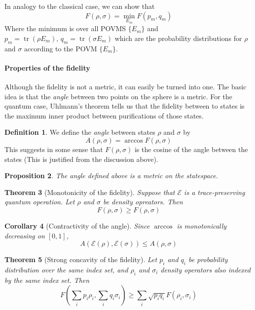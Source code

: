 \documentclass[11pt,a4paper]{article}
\theoremstyle{definition}
\newtheorem{definition}{Definition}[section]
\theoremstyle{plain}
\newtheorem{theorem}[definition]{Theorem}
\newtheorem{proposition}[definition]{Proposition}
\newtheorem{corollary}[definition]{Corollary}
\theoremstyle{remark}
\begin{document}
In analogy to the classical case, we can show that 
$$F(\rho, \sigma) = \min_{E_m} F(p_m, q_m)$$
Where the minimum is over all POVMS $\{E_m\}$ and $p_m = \operatorname{tr}(\rho E_m), \, q_m = \operatorname{tr}(\sigma E_m)$ which are the 
probability distributions for $\rho$ and $\sigma$ according to the POVM $\{E_m\}$. 

\paragraph{Properties of the fidelity} Although the fidelity is not a metric, it can easily be turned into one. 
The basic idea is that the \emph{angle} between two points on the sphere is a metric. For the quantum case, Uhlmann's theorem tells us that the 
fidelity between to states is the maximum inner product between purifications of those states. 

\begin{definition}
  We define the \emph{angle} between states $\rho$ and $\sigma$ by 
  $$A(\rho, \sigma) = \arccos F(\rho, \sigma)$$
  This suggests in some sense that $F(\rho, \sigma)$ is the cosine of the angle between the states 
  (This is justified from the discussion above). 
\end{definition}

\begin{proposition}
  The angle defined above is a metric on the statespace. 
\end{proposition}

\begin{theorem}[Monotonicity of the fidelity]\label{thm:Monotonicity-fidelity}
  Suppose that $\mathcal{E}$ is a trace-preserving quantum operation. Let $\rho$ and $\sigma$ be density opreators. Then 
  $$F(\mathcal{\rho}, \mathcal{\sigma}) \geq F(\rho, \sigma)$$
\end{theorem}

\begin{corollary}[Contractivity of the angle]\label{thm:contractivity-angle}
  Since $\arccos$ is monotonically decreasing on $[0,1]$, 
  $$A(\mathcal{E}(\rho), \mathcal{E}(\sigma)) \leq A(\rho, \sigma)$$
\end{corollary}

\begin{theorem}[Strong concavity of the fidelity]\label{thm:strong-concavity-fidelity}
  Let $p_i$ and $q_i$ be probability distribution over the same index set, and $\rho_i$ and $\sigma_i$ density operators also indexed by the same index set. Then 
  $$F \left(\sum_i p_i \rho_i, \sum_i q_i \sigma_i\right) \geq \sum_i \sqrt{p_i q_i} F(\rho_i, \sigma_i)$$
\end{theorem}
\end{document}
